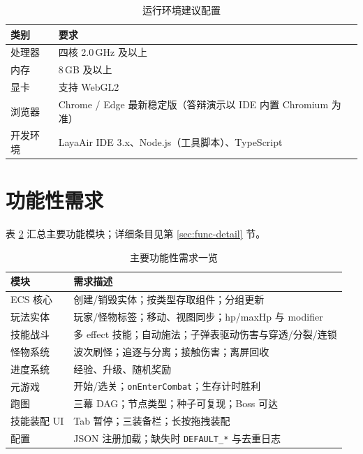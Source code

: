\documentclass[UTF8,a4paper]{ctexart}
\begin{document}
\begin{table}[htbp]
  
  \caption{运行环境建议配置}
  \label{tab:run-env}
  \begin{tabular}{ll}
    \toprule
    \textbf{类别} & \textbf{要求} \\
    \midrule
    处理器 & 四核 2.0\,GHz 及以上 \\
    内存 & 8\,GB 及以上 \\
    显卡 & 支持 WebGL2 \\
    浏览器 & Chrome / Edge 最新稳定版（答辩演示以 IDE 内置 Chromium 为准） \\
    开发环境 & LayaAir IDE 3.x、Node.js（工具脚本）、TypeScript \\
    \bottomrule
  \end{tabular}
\end{table}

\section{功能性需求}

表 \ref{tab:func-req} 汇总主要功能模块；详细条目见第 \ref{sec:func-detail} 节。

\begin{table}[htbp]
  
  \caption{主要功能性需求一览}
  \label{tab:func-req}
  \begin{tabular}{p{3.0cm}p{9.7cm}}
    \toprule
    \textbf{模块} & \textbf{需求描述} \\
    \midrule
    ECS 核心 & 创建/销毁实体；按类型存取组件；分组更新 \\
    玩法实体 & 玩家/怪物标签；移动、视图同步；hp/maxHp 与 modifier \\
    技能战斗 & 多 effect 技能；自动施法；子弹表驱动伤害与穿透/分裂/连锁 \\
    怪物系统 & 波次刷怪；追逐与分离；接触伤害；离屏回收 \\
    进度系统 & 经验、升级、随机奖励 \\
    元游戏 & 开始/选关；\texttt{onEnterCombat}；生存计时胜利 \\
    跑图 & 三幕 DAG；节点类型；种子可复现；Boss 可达 \\
    技能装配 UI & Tab 暂停；三装备栏；长按拖拽装配 \\
    配置 & JSON 注册加载；缺失时 \texttt{DEFAULT\_*} 与去重日志 \\
    \bottomrule
  \end{tabular}
\end{table}
\end{document}
